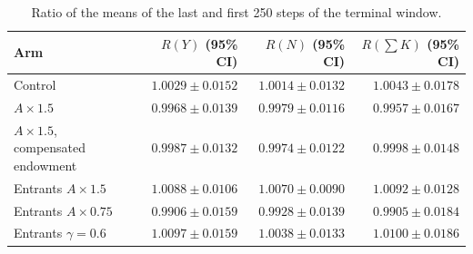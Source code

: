 \begin{table}[htbp]\centering\small
\caption{Ratio of the means of the last and first 250 steps of the terminal window.}\label{tab:stationnarite}
\begin{tabular}{@{}lrrr@{}}
\toprule
Arm & $R(Y)$ (95\% CI) & $R(N)$ (95\% CI) & $R(\sum K)$ (95\% CI) \\
\midrule
Control & $1.0029\pm0.0152$ & $1.0014\pm0.0132$ & $1.0043\pm0.0178$ \\
$A\times1.5$ & $0.9968\pm0.0139$ & $0.9979\pm0.0116$ & $0.9957\pm0.0167$ \\
$A\times1.5$, compensated endowment & $0.9987\pm0.0132$ & $0.9974\pm0.0122$ & $0.9998\pm0.0148$ \\
Entrants $A\times1.5$ & $1.0088\pm0.0106$ & $1.0070\pm0.0090$ & $1.0092\pm0.0128$ \\
Entrants $A\times0.75$ & $0.9906\pm0.0159$ & $0.9928\pm0.0139$ & $0.9905\pm0.0184$ \\
Entrants $\gamma=0.6$ & $1.0097\pm0.0159$ & $1.0038\pm0.0133$ & $1.0100\pm0.0186$ \\
\bottomrule\end{tabular}\end{table}
